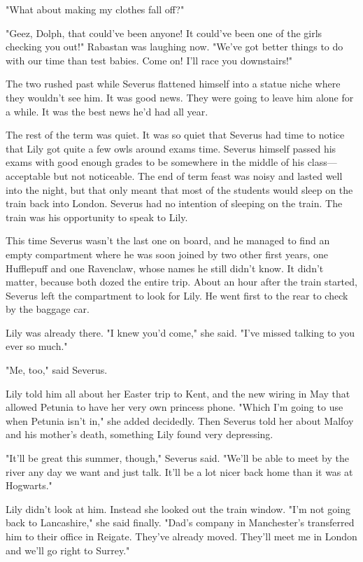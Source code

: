 "What about making my clothes fall off?"

"Geez, Dolph, that could've been anyone! It could've been one of the girls checking you out!" Rabastan was laughing now. "We've got better things to do with our time than test babies. Come on! I'll race you downstairs!"

The two rushed past while Severus flattened himself into a statue niche where they wouldn't see him. It was good news. They were going to leave him alone for a while. It was the best news he'd had all year.

The rest of the term was quiet. It was so quiet that Severus had time to notice that Lily got quite a few owls around exams time. Severus himself passed his exams with good enough grades to be somewhere in the middle of his class—acceptable but not noticeable. The end of term feast was noisy and lasted well into the night, but that only meant that most of the students would sleep on the train back into London. Severus had no intention of sleeping on the train. The train was his opportunity to speak to Lily.

This time Severus wasn't the last one on board, and he managed to find an empty compartment where he was soon joined by two other first years, one Hufflepuff and one Ravenclaw, whose names he still didn't know. It didn't matter, because both dozed the entire trip. About an hour after the train started, Severus left the compartment to look for Lily. He went first to the rear to check by the baggage car.

Lily was already there. "I knew you'd come," she said. "I've missed talking to you ever so much."

"Me, too," said Severus.

Lily told him all about her Easter trip to Kent, and the new wiring in May that allowed Petunia to have her very own princess phone. "Which I'm going to use when Petunia isn't in," she added decidedly. Then Severus told her about Malfoy and his mother's death, something Lily found very depressing.

"It'll be great this summer, though," Severus said. "We'll be able to meet by the river any day we want and just talk. It'll be a lot nicer back home than it was at Hogwarts."

Lily didn't look at him. Instead she looked out the train window. "I'm not going back to Lancashire," she said finally. "Dad's company in Manchester's transferred him to their office in Reigate. They've already moved. They'll meet me in London and we'll go right to Surrey."

